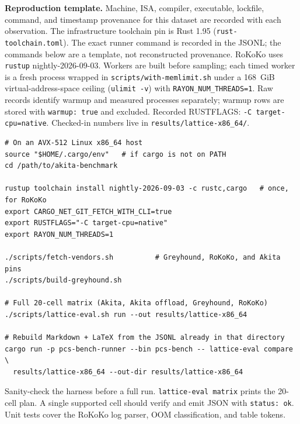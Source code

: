 \medskip
\noindent\textbf{Reproduction template.}
Machine, ISA, compiler, executable, lockfile, command, and timestamp provenance
for this dataset are recorded with each observation. The infrastructure
toolchain pin is Rust 1.95 (\texttt{rust-toolchain.toml}).
The exact runner command is recorded in the JSONL; the commands below are a
template, not reconstructed provenance.
RoKoKo uses \texttt{rustup} nightly-2026-09-03. Workers are built before
sampling; each timed worker is a fresh process wrapped in
\texttt{scripts/with-memlimit.sh} under a 168~GiB
virtual-address-space ceiling (\texttt{ulimit -v}) with
\texttt{RAYON\_NUM\_THREADS=1}. Raw records identify warmup and measured
processes separately; warmup rows are stored with \texttt{warmup: true} and excluded.
Recorded RUSTFLAGS: \texttt{{-C target-cpu=native}}.
Checked-in numbers live in \texttt{results/lattice-x86\_64/}.
\begin{verbatim}
# On an AVX-512 Linux x86_64 host
source "$HOME/.cargo/env"   # if cargo is not on PATH
cd /path/to/akita-benchmark

rustup toolchain install nightly-2026-09-03 -c rustc,cargo   # once, for RoKoKo
export CARGO_NET_GIT_FETCH_WITH_CLI=true
export RUSTFLAGS="-C target-cpu=native"
export RAYON_NUM_THREADS=1

./scripts/fetch-vendors.sh          # Greyhound, RoKoKo, and Akita pins
./scripts/build-greyhound.sh

# Full 20-cell matrix (Akita, Akita offload, Greyhound, RoKoKo)
./scripts/lattice-eval.sh run --out results/lattice-x86_64

# Rebuild Markdown + LaTeX from the JSONL already in that directory
cargo run -p pcs-bench-runner --bin pcs-bench -- lattice-eval compare \
  results/lattice-x86_64 --out-dir results/lattice-x86_64
\end{verbatim}
\noindent Sanity-check the harness before a full run.
\texttt{lattice-eval matrix} prints the 20-cell plan.
A single supported cell should verify and emit JSON with \texttt{status: ok}.
Unit tests cover the RoKoKo log parser, OOM classification, and table tokens.
